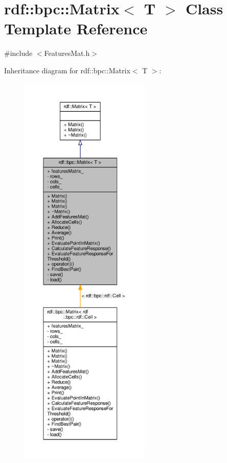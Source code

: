 \hypertarget{classrdf_1_1bpc_1_1Matrix}{}\section{rdf\+:\+:bpc\+:\+:Matrix$<$ T $>$ Class Template Reference}
\label{classrdf_1_1bpc_1_1Matrix}


{\ttfamily \#include $<$Features\+Mat.\+h$>$}



Inheritance diagram for rdf\+:\+:bpc\+:\+:Matrix$<$ T $>$\+:
\nopagebreak
\begin{figure}[H]
\begin{center}
\leavevmode
\includegraphics[height=550pt]{classrdf_1_1bpc_1_1Matrix__inherit__graph}
\end{center}
\end{figure}


